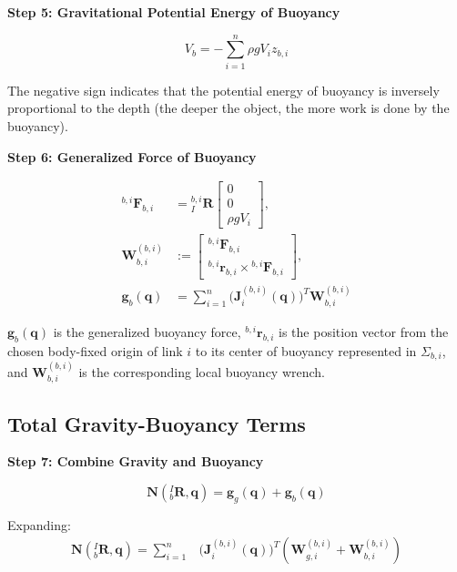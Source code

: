 \documentclass[12pt,a4paper]{report}
\newcommand{\newsymbols}[1]{\par\noindent{}#1\par\vspace{0.35em}}
\newcommand{\Frame}[1]{\Sigma_{#1}}
\begin{document}
\textbf{Step 5: Gravitational Potential Energy of Buoyancy}

\begin{equation}
V_b = -\sum_{i=1}^{n} \rho g V_i z_{b,i}
\label{eq:old-142}
\end{equation}

The negative sign indicates that the potential energy of buoyancy is inversely proportional to the depth (the deeper the object, the more work is done by the buoyancy).

\textbf{Step 6: Generalized Force of Buoyancy}

\begin{equation}
\begin{aligned}
{}^{b,i}\mathbf{F}_{b,i} &= {}_{I}^{b,i}\mathbf{R}\begin{bmatrix} 0 \\ 0 \\ \rho g V_i \end{bmatrix}, \\
\mathbf{W}_{b,i}^{(b,i)} &:=
\begin{bmatrix}
{}^{b,i}\mathbf{F}_{b,i} \\
{}^{b,i}\mathbf{r}_{b,i} \times {}^{b,i}\mathbf{F}_{b,i}
\end{bmatrix}, \\
\mathbf{g}_b(\mathbf{q}) &= \sum_{i=1}^{n} \bigl(\mathbf{J}_i^{(b,i)}(\mathbf{q})\bigr)^T \mathbf{W}_{b,i}^{(b,i)}
\end{aligned}
\label{eq:old-143}
\end{equation}
\newsymbols{$\mathbf{g}_b(\mathbf{q})$ is the generalized buoyancy force, ${}^{b,i}\mathbf{r}_{b,i}$ is the position vector from the chosen body-fixed origin of link $i$ to its center of buoyancy represented in $\Frame{b,i}$, and $\mathbf{W}_{b,i}^{(b,i)}$ is the corresponding local buoyancy wrench.}

\subsection{Total Gravity-Buoyancy Terms}

\textbf{Step 7: Combine Gravity and Buoyancy}

\begin{equation}
\mathbf{N}({}_{b}^{I}\mathbf{R}, \mathbf{q}) = \mathbf{g}_g(\mathbf{q}) + \mathbf{g}_b(\mathbf{q})
\label{eq:old-144}
\end{equation}

Expanding:
\begin{align}
\mathbf{N}({}_{b}^{I}\mathbf{R}, \mathbf{q}) = \sum_{i=1}^{n} &\bigl(\mathbf{J}_i^{(b,i)}(\mathbf{q})\bigr)^T
\left(
\mathbf{W}_{g,i}^{(b,i)} + \mathbf{W}_{b,i}^{(b,i)}
\right)
\end{align}
\end{document}
